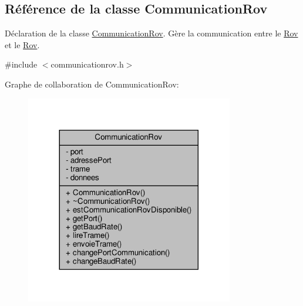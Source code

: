 \hypertarget{class_communication_rov}{}\subsection{Référence de la classe Communication\+Rov}
\label{class_communication_rov}


Déclaration de la classe \hyperlink{class_communication_rov}{Communication\+Rov}. Gère la communication entre le \hyperlink{class_rov}{Rov} et le \hyperlink{class_rov}{Rov}.  




{\ttfamily \#include $<$communicationrov.\+h$>$}



Graphe de collaboration de Communication\+Rov\+:
\nopagebreak
\begin{figure}[H]
\begin{center}
\leavevmode
\includegraphics[width=257pt]{class_communication_rov__coll__graph}
\end{center}
\end{figure}
